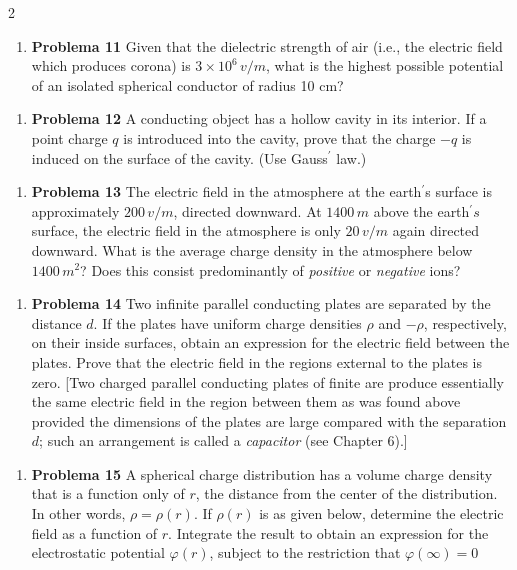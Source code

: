 \documentclass{article}
\begin{document}
\begin{multicols}{2}
\begin{enumerate}[label={{\textcolor{trueblue}{\textbf{Pr.} \arabic*.11}}}, start=2]
\item \textbf{Problema 11} Given that the dielectric strength of air (i.e., the electric field which produces corona) is $3 \times 10^{6} \, v/m$, what is the highest possible potential of an isolated spherical conductor of radius 10 cm?
\end{enumerate}

\begin{enumerate}[label={{\textcolor{trueblue}{\textbf{Pr.} \arabic*.12}}}, start=2]
\item \textbf{Problema 12} A conducting object has a hollow cavity in its interior. If a point charge $q$ is introduced into the cavity, prove that the charge $-q$ is induced on the surface of the cavity. (Use Gauss$^{\prime}$ law.)
\end{enumerate}

\begin{enumerate}[label={{\textcolor{trueblue}{\textbf{Pr.} \arabic*.13}}}, start=2]
\item \textbf{Problema 13} The electric field in the atmosphere at the earth$^{\prime}$s surface is approximately $200 \, v/m$, directed downward. At $1400 \, m$ above the earth$^{\prime}s$ surface, the electric field in the atmosphere is only $20\, v/m$ again directed  downward. What is the average charge density in the atmosphere below $1400 \, m^{2}$? Does this consist predominantly of \emph{positive} or \emph{negative} ions?
\end{enumerate}

\begin{enumerate}[label={{\textcolor{trueblue}{\textbf{Pr.} \arabic*.14}}}, start=2]
\item \textbf{Problema 14} Two infinite parallel conducting plates are separated by the distance $d$. If the plates have uniform charge densities $\rho$ and $-\rho$, respectively, on their inside surfaces, obtain an expression for the electric field between the plates. Prove that the electric field in the regions external to the plates is zero. [Two charged parallel conducting plates of finite are produce essentially the same electric field in the region between them as was found above provided the dimensions of the plates are large compared with the separation $d$; such an arrangement is called a \emph{capacitor} (see Chapter 6).]
\end{enumerate}

\begin{enumerate}[label={{\textcolor{trueblue}{\textbf{Pr.} \arabic*.15}}}, start=2]
\item \textbf{Problema 15} A spherical charge distribution has a volume charge density that is a function only of $r$, the distance from the center of the distribution. In other words, $\rho = \rho(r)$. If $\rho(r)$ is as given below, determine the electric field as a function of $r$. Integrate the result to obtain an expression for the electrostatic potential $\varphi(r)$, subject to the restriction that $\varphi(\infty)=0$


\end{enumerate}
\end{multicols}
\end{document}
